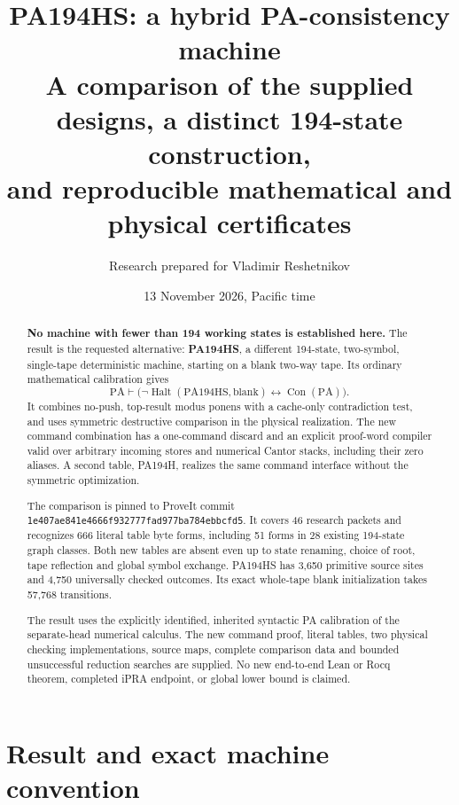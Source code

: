 \documentclass[11pt,letterpaper]{article}
\title{PA194HS: a hybrid PA-consistency machine\\[0.5em]
\large A comparison of the supplied designs, a distinct 194-state construction,\\
and reproducible mathematical and physical certificates}
\author{Research prepared for Vladimir Reshetnikov}
\date{13 November 2026, Pacific time}
\newcommand{\PA}{\mathrm{PA}}
\newcommand{\Con}{\operatorname{Con}}
\newcommand{\Halt}{\operatorname{Halt}}
\begin{document}
\maketitle
\begin{abstract}
\textbf{No machine with fewer than 194 working states is established here.}
The result is the requested alternative: \textbf{PA194HS}, a different
194-state, two-symbol, single-tape deterministic machine, starting on a blank
two-way tape. Its ordinary mathematical calibration gives
\[
 \PA\vdash\bigl(\neg\Halt(\mathrm{PA194HS},\mathrm{blank})
                       \leftrightarrow\Con(\PA)\bigr).
\]
It combines no-push, top-result modus ponens with a cache-only contradiction
test, and uses symmetric destructive comparison in the physical realization.
The new command combination has a one-command discard and an explicit
proof-word compiler valid over arbitrary incoming stores and numerical
Cantor stacks, including their zero aliases. A second table, PA194H, realizes
the same command interface without the symmetric optimization.

The comparison is pinned to ProveIt commit
\nolinkurl{1e407ae841e4666f932777fad977ba784ebbcfd5}. It covers 46 research
packets and recognizes 666 literal table byte forms, including 51 forms in
28 existing 194-state graph classes. Both new tables are absent even up to
state renaming, choice of root, tape reflection and global symbol exchange.
PA194HS has 3,650 primitive source sites and 4,750 universally checked
outcomes. Its exact whole-tape blank initialization takes 57,768 transitions.

The result uses the explicitly identified, inherited syntactic PA
calibration of the separate-head numerical calculus. The new command proof,
literal tables, two physical checking implementations, source maps, complete
comparison data and bounded unsuccessful reduction searches are supplied.
No new end-to-end Lean or Rocq theorem, completed iPRA endpoint, or global
lower bound is claimed.
\end{abstract}
\clearpage\tableofcontents\clearpage

\section{Result and exact machine convention}
\end{document}
